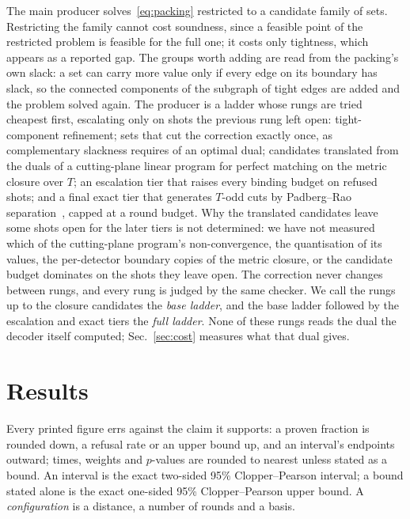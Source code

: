 \documentclass[aps,pra,twocolumn,superscriptaddress,nofootinbib,longbibliography,floatfix]{revtex4-2}
\newcommand{\T}{T}
\begin{document}
The main producer solves~\eqref{eq:packing} restricted to a candidate family of sets. Restricting the family cannot cost soundness, since a feasible point of the restricted problem is feasible for the full one; it costs only tightness, which appears as a reported gap. The groups worth adding are read from the packing's own slack: a set can carry more value only if every edge on its boundary has slack, so the connected components of the subgraph of tight edges are added and the problem solved again. The producer is a ladder whose rungs are tried cheapest first, escalating only on shots the previous rung left open: tight-component refinement; sets that cut the correction exactly once, as complementary slackness requires of an optimal dual; candidates translated from the duals of a cutting-plane linear program for perfect matching on the metric closure over $\T$; an escalation tier that raises every binding budget on refused shots; and a final exact tier that generates $\T$-odd cuts by Padberg--Rao separation~\cite{padbergrao1982}, capped at a round budget. Why the translated candidates leave some shots open for the later tiers is not determined: we have not measured which of the cutting-plane program's non-convergence, the quantisation of its values, the per-detector boundary copies of the metric closure, or the candidate budget dominates on the shots they leave open. The correction never changes between rungs, and every rung is judged by the same checker. We call the rungs up to the closure candidates the \emph{base ladder}, and the base ladder followed by the escalation and exact tiers the \emph{full ladder}. None of these rungs reads the dual the decoder itself computed; Sec.~\ref{sec:cost} measures what that dual gives.

\section{Results}
\label{sec:results}

Every printed figure errs against the claim it supports: a proven fraction is rounded down, a refusal rate or an upper bound up, and an interval's endpoints outward; times, weights and $p$-values are rounded to nearest unless stated as a bound. An interval is the exact two-sided 95\% Clopper--Pearson interval; a bound stated alone is the exact one-sided 95\% Clopper--Pearson upper bound. A \emph{configuration} is a distance, a number of rounds and a basis.
\end{document}
